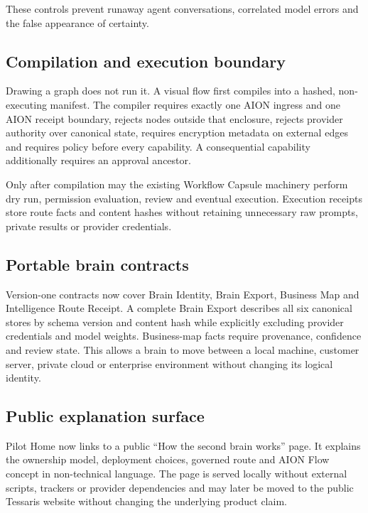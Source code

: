These controls prevent runaway agent conversations, correlated model errors and
the false appearance of certainty.

\subsection{Compilation and execution boundary}

Drawing a graph does not run it.  A visual flow first compiles into a hashed,
non-executing manifest.  The compiler requires exactly one AION ingress and one
AION receipt boundary, rejects nodes outside that enclosure, rejects provider
authority over canonical state, requires encryption metadata on external edges and
requires policy before every capability.  A consequential capability additionally
requires an approval ancestor.

Only after compilation may the existing Workflow Capsule machinery perform dry
run, permission evaluation, review and eventual execution.  Execution receipts
store route facts and content hashes without retaining unnecessary raw prompts,
private results or provider credentials.

\subsection{Portable brain contracts}

Version-one contracts now cover Brain Identity, Brain Export, Business Map and
Intelligence Route Receipt.  A complete Brain Export describes all six canonical
stores by schema version and content hash while explicitly excluding provider
credentials and model weights.  Business-map facts require provenance, confidence
and review state.  This allows a brain to move between a local machine, customer
server, private cloud or enterprise environment without changing its logical
identity.

\subsection{Public explanation surface}

Pilot Home now links to a public ``How the second brain works'' page.  It explains
the ownership model, deployment choices, governed route and AION Flow concept in
non-technical language.  The page is served locally without external scripts,
trackers or provider dependencies and may later be moved to the public Tessaris
website without changing the underlying product claim.

